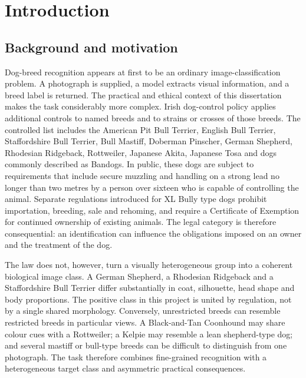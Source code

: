 \chapter{Introduction}
\label{chap:introduction}

\section{Background and motivation}
Dog-breed recognition appears at first to be an ordinary image-classification problem. A photograph is supplied, a model extracts visual information, and a breed label is returned. The practical and ethical context of this dissertation makes the task considerably more complex. Irish dog-control policy applies additional controls to named breeds and to strains or crosses of those breeds. The controlled list includes the American Pit Bull Terrier, English Bull Terrier, Staffordshire Bull Terrier, Bull Mastiff, Doberman Pinscher, German Shepherd, Rhodesian Ridgeback, Rottweiler, Japanese Akita, Japanese Tosa and dogs commonly described as Bandogs. In public, these dogs are subject to requirements that include secure muzzling and handling on a strong lead no longer than two metres by a person over sixteen who is capable of controlling the animal. Separate regulations introduced for XL Bully type dogs prohibit importation, breeding, sale and rehoming, and require a Certificate of Exemption for continued ownership of existing animals. The legal category is therefore consequential: an identification can influence the obligations imposed on an owner and the treatment of the dog.

The law does not, however, turn a visually heterogeneous group into a coherent biological image class. A German Shepherd, a Rhodesian Ridgeback and a Staffordshire Bull Terrier differ substantially in coat, silhouette, head shape and body proportions. The positive class in this project is united by regulation, not by a single shared morphology. Conversely, unrestricted breeds can resemble restricted breeds in particular views. A Black-and-Tan Coonhound may share colour cues with a Rottweiler; a Kelpie may resemble a lean shepherd-type dog; and several mastiff or bull-type breeds can be difficult to distinguish from one photograph. The task therefore combines fine-grained recognition with a heterogeneous target class and asymmetric practical consequences.

